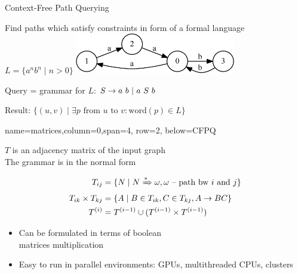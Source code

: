 \documentclass[a0paper,portrait]{baposter}
\begin{document}
\begin{poster}
\begin{posterbox}[name=CFPQ,column=0,row=0, span=4]{Context-Free Path Querying}

  Find paths which satisfy constraints in form of a formal language $L=\{a^n b^n \mid n > 0\}$
    \includegraphics[width=7cm]{example_graph_transparent.png}

    Query = grammar for $L$: $S  \rightarrow a  \ b \ | \ a \ S \ b  \\$

  Result: $ \{(u,v) \mid \exists p \text{ from } u \text{ to } v: \text{word}(p) \in L\} $

\end{posterbox}

{name=matrices,column=0,span=4, row=2, below=CFPQ}%
{

$T$ is an adjacency matrix of the input graph\\
The grammar is in the normal form
\vspace{-0.5cm}

\begin{align*}
T_{ij} &=\{ N \mid N \xRightarrow[]{*} \omega,  \omega \text{ -- path bw } i \text{ and } j \} \\
T_{ik} \times T_{kj} &= \{ A \mid B \in T_{ik}, C \in T_{kj}, A \rightarrow B C \} \\
T^{(i)} &= T^{(i-1)} \cup (T^{(i-1)} \times T^{(i-1)})
\end{align*}

\begin{itemize}
  \item Can be formulated in terms of boolean \\ matrices multiplication
  \item Easy to run in parallel environments: GPUs, multithreaded CPUs, clusters
\end{itemize}
\vspace{0.1cm}
}


\end{poster}
\end{document}
